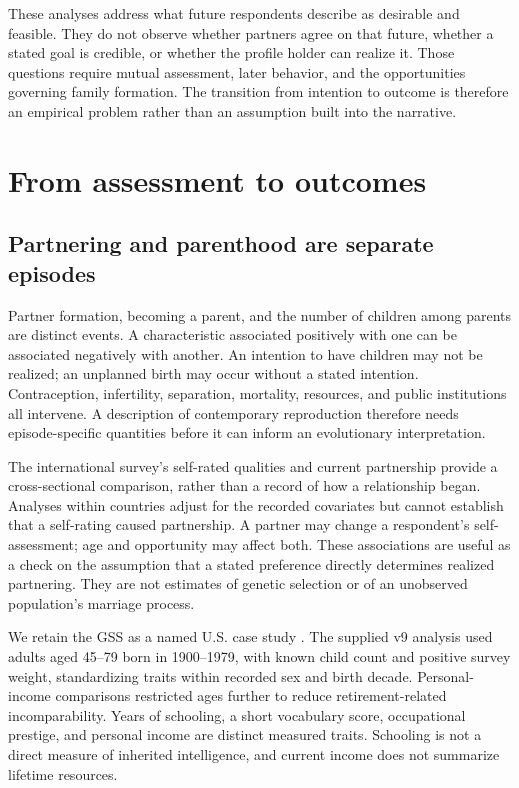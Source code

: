 These analyses address what future respondents describe as desirable and feasible. They do not observe whether partners agree on that future, whether a stated goal is credible, or whether the profile holder can realize it. Those questions require mutual assessment, later behavior, and the opportunities governing family formation. The transition from intention to outcome is therefore an empirical problem rather than an assumption built into the narrative.

\section{From assessment to outcomes}\label{sec:minds-outcomes}

\subsection{Partnering and parenthood are separate episodes}

Partner formation, becoming a parent, and the number of children among parents are distinct events. A characteristic associated positively with one can be associated negatively with another. An intention to have children may not be realized; an unplanned birth may occur without a stated intention. Contraception, infertility, separation, mortality, resources, and public institutions all intervene. A description of contemporary reproduction therefore needs episode-specific quantities before it can inform an evolutionary interpretation.

The international survey's self-rated qualities and current partnership provide a cross-sectional comparison, rather than a record of how a relationship began. Analyses within countries adjust for the recorded covariates but cannot establish that a self-rating caused partnership. A partner may change a respondent's self-assessment; age and opportunity may affect both. These associations are useful as a check on the assumption that a stated preference directly determines realized partnering. They are not estimates of genetic selection or of an unobserved population's marriage process.

We retain the GSS as a named U.S. case study \citep{gss2024}. The supplied v9 analysis used adults aged 45--79 born in 1900--1979, with known child count and positive survey weight, standardizing traits within recorded sex and birth decade. Personal-income comparisons restricted ages further to reduce retirement-related incomparability. Years of schooling, a short vocabulary score, occupational prestige, and personal income are distinct measured traits. Schooling is not a direct measure of inherited intelligence, and current income does not summarize lifetime resources.

